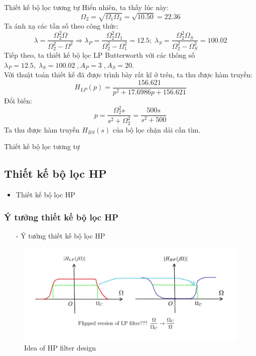 \documentclass[8pt]{beamer}
\begin{document}
\begin{frame}{Thiết kế bộ lọc tương tự}
Hiển nhiên, ta thấy lúc này: $$\Omega_{2}=\sqrt{\Omega_{1}\Omega_{3}}=\sqrt{10.50}=22.36$$ Ta ánh xạ các tần số theo công thức:
$$\lambda=\frac{\Omega_{2}^2\Omega}{\Omega_{2}^2-\Omega^2}\Rightarrow \lambda_{P}=\frac{\Omega_{2}^2\Omega_{1}}{\Omega_{2}^2-\Omega_{1}^2}=12.5;\;\lambda_{S}=\frac{\Omega_{2}^2\Omega_{S}}{\Omega_{2}^2-\Omega_{S}^2}=100.02$$
Tiếp theo, ta thiết kế bộ lọc LP Butterworth  với các thông số $\lambda_{P}=12.5,\;\lambda_{S}=100.02\; ,A_{P}=3\; ,A_{S}=20$. \\Với thuật toán thiết kế đã được trình bày rất kĩ ở trên, ta thu được hàm truyền:
$$H_{LP}(p)=\frac{156.621}{p^2+17.6986p+156.621}$$
Đổi biến: 
$$p=\frac{\Omega_{2}^2s}{s^2+\Omega_{2}^2}=\frac{500s}{s^2+500}$$
Ta thu được hàm truyền $H_{BS}(s)$ của bộ lọc chặn dải cần tìm.
\end{frame}
\begin{frame}{Thiết kế bộ lọc tương tự}
\subsection{Thiết kế bộ lọc HP}
\begin{itemize}
	\item Thiết kế bộ lọc HP
\end{itemize}
\subsubsection{Ý tưởng thiết kế bộ lọc HP}
\begin{itemize}
	\item[-] Ý tưởng thiết kế bộ lọc HP
\end{itemize}
\begin{figure}[h]
	\includegraphics[width=1\textwidth]{23.jpg}
	\caption{Idea of HP filter design}			\label{fig:re2}
		\end{figure}

\end{frame}
\end{document}
